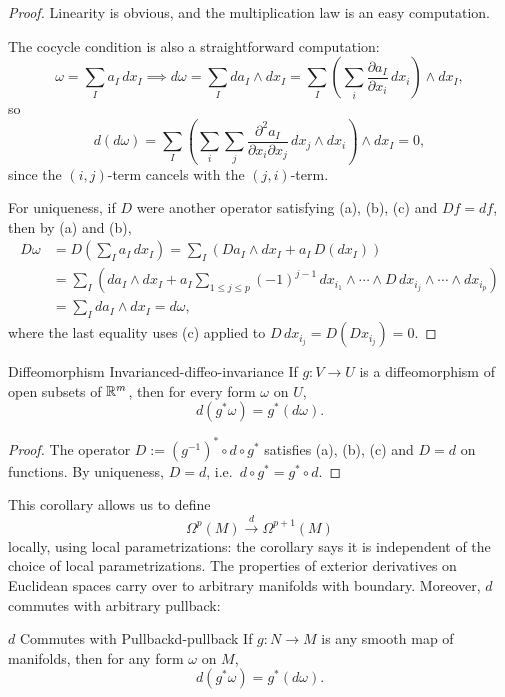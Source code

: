 \begin{proof}
    Linearity is obvious, and the multiplication law is an easy computation.

    The cocycle condition is also a straightforward computation:
    \[
        \omega = \sum_I a_I\, dx_I \implies d\omega = \sum_I da_I \wedge dx_I = \sum_I \left( \sum_i \frac{\partial a_I}{\partial x_i}\, dx_i \right) \wedge dx_I,
    \]
    so
    \[
        d(d\omega) = \sum_I \left( \sum_i \sum_j \frac{\partial^2 a_I}{\partial x_i \partial x_j}\, dx_j \wedge dx_i \right) \wedge dx_I = 0,
    \]
    since the $(i,j)$-term cancels with the $(j,i)$-term.

    For uniqueness, if $D$ were another operator satisfying (a), (b), (c) and $Df = df$, then by (a) and (b),
    \begin{align*}
        D\omega &= D\!\left(\sum_I a_I\, dx_I\right) = \sum_I \left( Da_I \wedge dx_I + a_I\, D(dx_I) \right) \\
        &= \sum_I \left( da_I \wedge dx_I + a_I \sum_{1 \leq j \leq p} (-1)^{j-1}\, dx_{i_1} \wedge \cdots \wedge D\, dx_{i_j} \wedge \cdots \wedge dx_{i_p} \right) \\
        &= \sum_I da_I \wedge dx_I = d\omega,
    \end{align*}
    where the last equality uses (c) applied to $D\, dx_{i_j} = D(D x_{i_j}) = 0$.
\end{proof}

\begin{corollary}{Diffeomorphism Invariance}{d-diffeo-invariance}
    If $g \colon V \to U$ is a diffeomorphism of open subsets of $\mathbb{R}^m$, then for every form $\omega$ on $U$,
    \[
        d(g^*\omega) = g^*(d\omega).
    \]
\end{corollary}

\begin{proof}
    The operator $D := (g^{-1})^* \circ d \circ g^*$ satisfies (a), (b), (c) and $D = d$ on functions. By uniqueness, $D = d$, i.e.\ $d \circ g^* = g^* \circ d$.
\end{proof}

This corollary allows us to define
\[
    \Omega^p(M) \xrightarrow{d} \Omega^{p+1}(M)
\]
locally, using local parametrizations: the corollary says it is independent of the choice of local parametrizations. The properties of exterior derivatives on Euclidean spaces carry over to arbitrary manifolds with boundary. Moreover, $d$ commutes with arbitrary pullback:

\begin{theorem}{$d$ Commutes with Pullback}{d-pullback}
    If $g \colon N \to M$ is any smooth map of manifolds, then for any form $\omega$ on $M$,
    \[
        d(g^*\omega) = g^*(d\omega).
    \]
\end{theorem}


